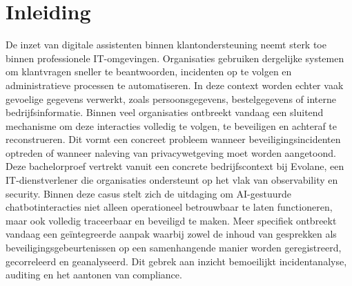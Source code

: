 


% 

\section{Inleiding}%
\label{sec:inleiding}

\noindent De inzet van digitale assistenten binnen klantondersteuning neemt sterk toe binnen professionele IT-omgevingen. Organisaties gebruiken dergelijke systemen om klantvragen sneller te beantwoorden, incidenten op te volgen en administratieve processen te automatiseren. In deze context worden echter vaak gevoelige gegevens verwerkt, zoals persoonsgegevens, bestelgegevens of interne bedrijfsinformatie. Binnen veel organisaties ontbreekt vandaag een sluitend mechanisme om deze interacties volledig te volgen, te beveiligen en achteraf te reconstrueren. Dit vormt een concreet probleem wanneer beveiligingsincidenten optreden of wanneer naleving van privacywetgeving moet worden aangetoond.\\

\noindent Deze bachelorproef vertrekt vanuit een concrete bedrijfscontext bij Evolane, een IT-dienstverlener die organisaties ondersteunt op het vlak van observability en security. Binnen deze casus stelt zich de uitdaging om AI-gestuurde chatbotinteracties niet alleen operationeel betrouwbaar te laten functioneren, maar ook volledig traceerbaar en beveiligd te maken. Meer specifiek ontbreekt vandaag een geïntegreerde aanpak waarbij zowel de inhoud van gesprekken als beveiligingsgebeurtenissen op een samenhangende manier worden geregistreerd, gecorreleerd en geanalyseerd. Dit gebrek aan inzicht bemoeilijkt incidentanalyse, auditing en het aantonen van compliance.\\

